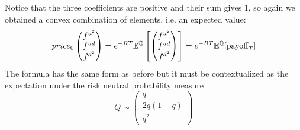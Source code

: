Notice that the three coefficients are positive and their sum gives 1, so again we obtained a convex combination of elements, i.e. an expected value:
\begin{equation}
    price_0
    \left(
    \begin{matrix}
        f^{u^2} \\ f^{ud} \\ f^{d^2}
    \end{matrix}
    \right)
    = e^{-RT} \mathbb{E}^{\mathbb{Q}}
    \left[
    \left(
    \begin{matrix}
        f^{u^2} \\ f^{ud} \\ f^{d^2}
    \end{matrix}
    \right)
    \right]
    = e^{-RT}\mathbb{E}^{\mathbb{Q}}[\mbox{payoff}_T]
\end{equation}
The formula has the same form as before but it must be contextualized as the expectation under the risk neutral probability measure
\begin{equation}
    Q \sim
    \left(
    \begin{matrix}
        q \\ 2q(1-q) \\ q^2
    \end{matrix}
    \right)
\end{equation}

